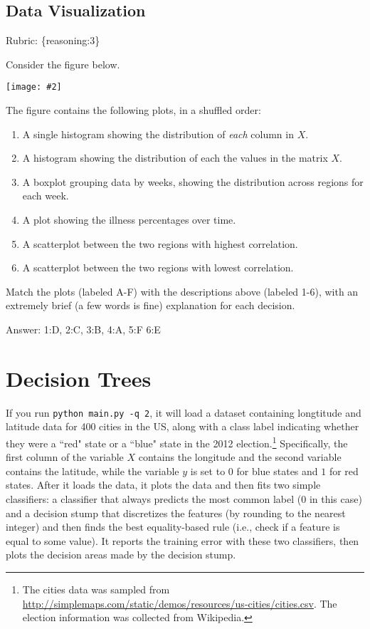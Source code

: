 \documentclass{article}
\def\ans#1{\par\gre{Answer: #1}}
\def\answer#1{\ans{#1}}
\def\rubric#1{\gre{Rubric: \{#1\}}}{}
\def\blu#1{{\color{blu}#1}}
\def\gre#1{{\color{gre}#1}}
\newcommand{\fig}[2]{\texttt{[image: \#2]}}
\def\enum#1{\begin{enumerate}#1\end{enumerate}}
\begin{document}
\subsection{Data Visualization}
\rubric{reasoning:3}

Consider the figure below.

\fig{1}{../figs/q12visualize-unlabeled}

The figure contains the following plots, in a shuffled order:
\enum{
\item A single histogram showing the distribution of \emph{each} column in $X$.
\item A histogram showing the distribution of each the values in the matrix $X$.
\item A boxplot grouping data by weeks, showing the distribution across regions for each week.
\item A plot showing the illness percentages over time.
\item A scatterplot between the two regions with highest correlation.
\item A scatterplot between the two regions with lowest correlation.
}

\blu{Match the plots (labeled A-F) with the descriptions above (labeled 1-6), with an extremely brief (a few words is fine) explanation for each decision.}

\answer{1:D, 2:C, 3:B, 4:A, 5:F 6:E}




\section{Decision Trees}

If you run \texttt{python main.py -q 2}, it will load a dataset containing longtitude and latitude data for 400 cities in the US, along with a class label indicating whether they were a ``red" state or a ``blue" state in the 2012 election.\footnote{The cities data was sampled from \url{http://simplemaps.com/static/demos/resources/us-cities/cities.csv}. The election information was collected from Wikipedia.}
Specifically, the first column of the variable $X$ contains the longitude and the second variable contains the latitude,
while the variable $y$ is set to $0$ for blue states and $1$ for red states.
After it loads the data, it plots the data and then fits two simple classifiers: a classifier that always predicts the
most common label ($0$ in this case) and a decision stump
that discretizes the features (by rounding to the nearest integer)
and then finds the best equality-based rule (i.e., check
 if a feature is equal to some value).
It reports the training error with these two classifiers, then plots the decision areas made by the decision stump.
\end{document}
